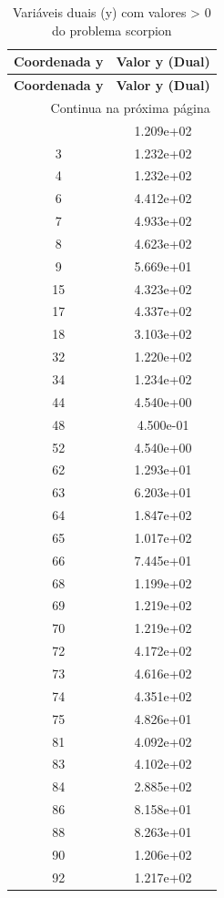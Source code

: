 \documentclass[12pt]{article}
\begin{document}
\begin{longtable}{@{}cc@{}}
\caption{Variáveis duais (y) com valores > 0 do problema scorpion} \\
\toprule
\textbf{Coordenada y} & \textbf{Valor y (Dual)} \\
\midrule
\endfirsthead

\toprule
\textbf{Coordenada y} & \textbf{Valor y (Dual)} \\
\midrule
\endhead

\midrule \multicolumn{2}{r}{{Continua na próxima página}} \\ \midrule
\endfoot

\bottomrule
\endlastfoot
2 & 1.209e+02 \\
3 & 1.232e+02 \\
4 & 1.232e+02 \\
6 & 4.412e+02 \\
7 & 4.933e+02 \\
8 & 4.623e+02 \\
9 & 5.669e+01 \\
15 & 4.323e+02 \\
17 & 4.337e+02 \\
18 & 3.103e+02 \\
32 & 1.220e+02 \\
34 & 1.234e+02 \\
44 & 4.540e+00 \\
48 & 4.500e-01 \\
52 & 4.540e+00 \\
62 & 1.293e+01 \\
63 & 6.203e+01 \\
64 & 1.847e+02 \\
65 & 1.017e+02 \\
66 & 7.445e+01 \\
68 & 1.199e+02 \\
69 & 1.219e+02 \\
70 & 1.219e+02 \\
72 & 4.172e+02 \\
73 & 4.616e+02 \\
74 & 4.351e+02 \\
75 & 4.826e+01 \\
81 & 4.092e+02 \\
83 & 4.102e+02 \\
84 & 2.885e+02 \\
86 & 8.158e+01 \\
88 & 8.263e+01 \\
90 & 1.206e+02 \\
92 & 1.217e+02 \\

\end{longtable}
\end{document}
